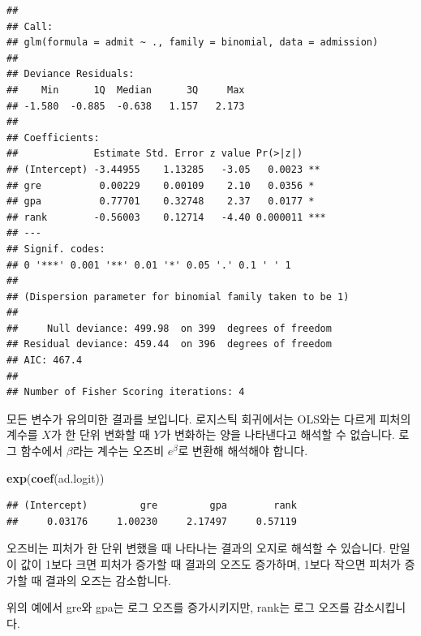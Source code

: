 \documentclass[12pt,]{book}
\newenvironment{Shaded}{\begin{snugshade}}{\end{snugshade}}
\newcommand{\DecValTok}[1]{\textcolor[rgb]{0.00,0.00,0.81}{#1}}
\newcommand{\FloatTok}[1]{\textcolor[rgb]{0.00,0.00,0.81}{#1}}
\newcommand{\KeywordTok}[1]{\textcolor[rgb]{0.13,0.29,0.53}{\textbf{#1}}}
\newcommand{\NormalTok}[1]{#1}
\newcommand{\OperatorTok}[1]{\textcolor[rgb]{0.81,0.36,0.00}{\textbf{#1}}}
\newcommand{\StringTok}[1]{\textcolor[rgb]{0.31,0.60,0.02}{#1}}
\begin{document}
\begin{verbatim}
## 
## Call:
## glm(formula = admit ~ ., family = binomial, data = admission)
## 
## Deviance Residuals: 
##    Min      1Q  Median      3Q     Max  
## -1.580  -0.885  -0.638   1.157   2.173  
## 
## Coefficients:
##             Estimate Std. Error z value Pr(>|z|)    
## (Intercept) -3.44955    1.13285   -3.05   0.0023 ** 
## gre          0.00229    0.00109    2.10   0.0356 *  
## gpa          0.77701    0.32748    2.37   0.0177 *  
## rank        -0.56003    0.12714   -4.40 0.000011 ***
## ---
## Signif. codes:  
## 0 '***' 0.001 '**' 0.01 '*' 0.05 '.' 0.1 ' ' 1
## 
## (Dispersion parameter for binomial family taken to be 1)
## 
##     Null deviance: 499.98  on 399  degrees of freedom
## Residual deviance: 459.44  on 396  degrees of freedom
## AIC: 467.4
## 
## Number of Fisher Scoring iterations: 4
\end{verbatim}

모든 변수가 유의미한 결과를 보입니다. 로지스틱 회귀에서는 OLS와는 다르게 피처의 계수를 \(X\)가 한 단위 변화할 때 \(Y\)가 변화하는 양을 나타낸다고 해석할 수 없습니다. 로그 함수에서 \(\beta\)라는 계수는 오즈비 \(e^\beta\)로 변환해 해석해야 합니다.

\begin{Shaded}
\begin{Highlighting}[]
\KeywordTok{exp}\NormalTok{(}\KeywordTok{coef}\NormalTok{(ad.logit))}
\end{Highlighting}
\end{Shaded}

\begin{verbatim}
## (Intercept)         gre         gpa        rank 
##     0.03176     1.00230     2.17497     0.57119
\end{verbatim}

오즈비는 피처가 한 단위 변했을 때 나타나는 결과의 오지로 해석할 수 있습니다. 만일 이 값이 1보다 크면 피처가 증가할 때 결과의 오즈도 증가하며, 1보다 작으면 피처가 증가할 때 결과의 오즈는 감소합니다.

위의 예에서 gre와 gpa는 로그 오즈를 증가시키지만, rank는 로그 오즈를 감소시킵니다.

\begin{Shaded}
\end{Shaded}
\end{document}
